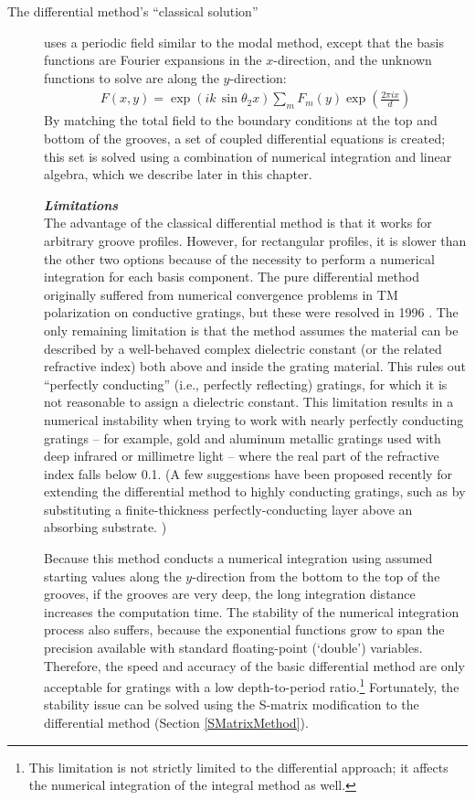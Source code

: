 \begin{description}
\item[The differential method's ``classical solution''] uses a periodic field similar to the modal method, except that the basis functions are Fourier expansions in the $x$-direction, and the unknown functions to solve are along the $y$-direction:
\begin{align}
F(x,y)=\exp\left( ik\, \sin \theta_{2}x \right) \sum\limits_m F_m(y) \exp \left( \frac{2\pi i x}{d} \right)
\end{align}
By matching the total field to the boundary conditions at the top and bottom of the grooves, a set of coupled differential equations is created; this set is solved using a combination of numerical integration and linear algebra, which we describe later in this chapter.  
 
\noindent\textbf{\emph{Limitations}}\\
The advantage of the classical differential method is that it works for arbitrary groove profiles.  However, for rectangular profiles, it is slower than the other two options because of the necessity to perform a numerical integration for each basis component.  The pure differential method originally suffered from numerical convergence problems in TM polarization on conductive gratings, but these were resolved in 1996 \cite{Li96b,Pop00}.  The only remaining limitation is that the method assumes the material can be described by a well-behaved complex dielectric constant (or the related refractive index) both above and inside the grating material.  This rules out ``perfectly conducting'' (i.e., perfectly reflecting) gratings, for which it is not reasonable to assign a dielectric constant.  This limitation results in a numerical instability when trying to work with nearly perfectly conducting gratings -- for example, gold and aluminum metallic gratings used with deep infrared or millimetre light -- where the real part of the refractive index falls below 0.1.  (A few suggestions have been proposed recently for extending the differential method to highly conducting gratings, such as by substituting a finite-thickness perfectly-conducting layer above an absorbing substrate. \cite{Pop04})
 
Because this method conducts a numerical integration using assumed starting values along the $y$-direction from the bottom to the top of the grooves, if the grooves are very deep, the long integration distance increases the computation time.  The stability of the numerical integration process also suffers, because the exponential functions grow to span the precision available with standard floating-point (`double') variables.   Therefore, the speed and accuracy of the basic differential method are only acceptable for gratings with a low depth-to-period ratio.\footnote{This limitation is not strictly limited to the differential approach; it affects the numerical integration of the integral method as well.}  Fortunately, the stability issue can be solved using the S-matrix modification to the differential method (Section \ref{SMatrixMethod}).
 

\end{description}
